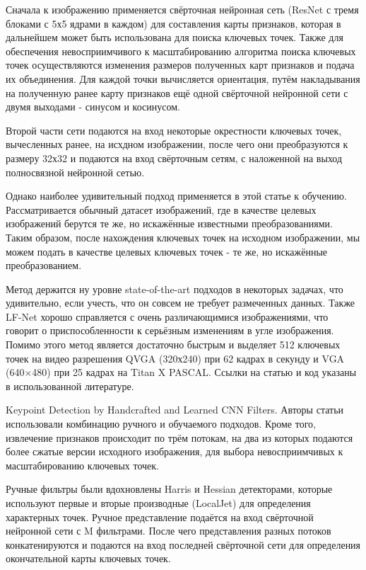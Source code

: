 \documentclass[a4paper]{article}
\begin{document}
Сначала к изображению применяется свёрточная нейронная сеть (ResNet с тремя блоками с 5х5 ядрами в каждом) для составления карты признаков, которая в дальнейшем может быть использована для поиска ключевых точек. Также для обеспечения невосприимчивого к масштабированию алгоритма поиска ключевых точек осуществляются изменения размеров полученных карт признаков и подача их объединения. Для каждой точки вычисляется ориентация, путём накладывания на полученную ранее карту признаков ещё одной свёрточной нейронной сети с двумя выходами - синусом и косинусом.
 
 
Второй части сети подаются на вход некоторые окрестности ключевых точек, вычесленных ранее, на исхдном изображении, после чего они преобразуются к размеру 32х32 и подаются на вход свёрточным сетям, с наложенной на выход полносвязной нейронной сетью.

Однако наиболее удивительный подход применяется в этой статье к обучению. Рассматривается обычный датасет изображений, где в качестве целевых изображений берутся те же, но искажённые известными преобразованиями. Таким образом, после нахождения ключевых точек на исходном изображении, мы можем подать в качестве целевых ключевых точек - те же, но искажённые преобразованием.


Метод держится ну уровне state-of-the-art подходов в некоторых задачах, что удивительно, если учесть, что он совсем не требует размеченных данных. Также LF-Net хорошо справляется с очень различающимися изображениями, что говорит о приспособленности к серьёзным изменениям в угле изображения. Помимо этого метод является достаточно быстрым и выделяет 512 ключевых точек на видео разрешения QVGA (320х240) при 62 кадрах в секунду и VGA (640×480) при 25 кадрах на Titan X PASCAL. Ссылки на статью и код указаны в использованной литературе.


 Keypoint Detection by Handcrafted and Learned CNN Filters. Авторы статьи использовали комбинацию ручного и обучаемого подходов. Кроме того, извлечение признаков происходит по трём потокам, на два из которых подаются более сжатые версии исходного изображения, для выбора невосприимчивых к масштабированию ключевых точек.




Ручные фильтры были вдохновлены Harris и Hessian детекторами, которые используют первые и вторые производные (LocalJet) для определения характерных точек. Ручное представление подаётся на вход свёрточной нейронной сети с M фильтрами. После чего представления разных потоков конкатенируются и подаются на вход последней свёрточной сети для определения окончательной карты ключевых точек. 
\end{document}
